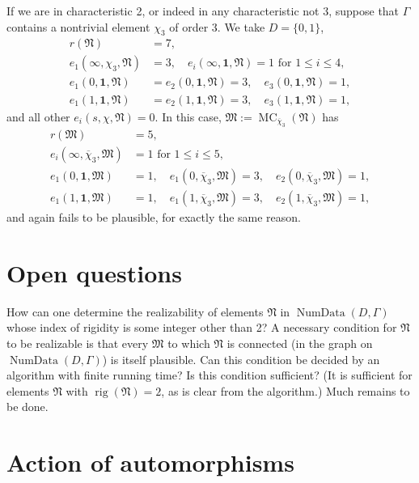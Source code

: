 If we are in characteristic 2, or indeed in any characteristic not 3, suppose that \(\Gamma\) contains a nontrivial element \(\chi_3\) of order 3. We take \(D=\{0,1\}\),
\[
\begin{aligned}
r(\mathfrak{N})&=7,\\
e_1(\infty,\chi_3,\mathfrak{N})&=3,\quad e_i(\infty,\mathbf{1},\mathfrak{N})=1\text{ for }1\leq i\leq 4,\\
e_1(0,\mathbf{1},\mathfrak{N})&=e_2(0,\mathbf{1},\mathfrak{N})=3,\quad e_3(0,\mathbf{1},\mathfrak{N})=1,\\
e_1(1,\mathbf{1},\mathfrak{N})&=e_2(1,\mathbf{1},\mathfrak{N})=3,\quad e_3(1,\mathbf{1},\mathfrak{N})=1,
\end{aligned}
\]
and all other \(e_i(s,\chi,\mathfrak{N})=0\). In this case, \(\mathfrak{M}:=\operatorname{MC}_{\overline{\chi}_3}(\mathfrak{N})\) has
\[
\begin{aligned}
r(\mathfrak{M})&=5,\\
e_i(\infty,\overline{\chi}_3,\mathfrak{M})&=1\text{ for }1\leq i\leq 5,\\
e_1(0,\mathbf{1},\mathfrak{M})&=1,\quad e_1(0,\overline{\chi}_3,\mathfrak{M})=3,\quad e_2(0,\overline{\chi}_3,\mathfrak{M})=1,\\
e_1(1,\mathbf{1},\mathfrak{M})&=1,\quad e_1(1,\overline{\chi}_3,\mathfrak{M})=3,\quad e_2(1,\overline{\chi}_3,\mathfrak{M})=1,
\end{aligned}
\]
and again fails to be plausible, for exactly the same reason.

\section{Open questions}
\label{sec:6.6}
How can one determine the realizability of elements \(\mathfrak{N}\) in \(\operatorname{NumData}(D,\Gamma)\) whose index of rigidity is some integer other than 2? A necessary condition for \(\mathfrak{N}\) to be realizable is that every \(\mathfrak{M}\) to which \(\mathfrak{N}\) is connected (in the graph on \(\operatorname{NumData}(D,\Gamma)\)) is itself plausible. Can this condition be decided by an algorithm with finite running time? Is this condition sufficient? (It is sufficient for elements \(\mathfrak{N}\) with \(\operatorname{rig}(\mathfrak{N})=2\), as is clear from the algorithm.) Much remains to be done.

\section{Action of automorphisms}
\label{sec:6.7}

